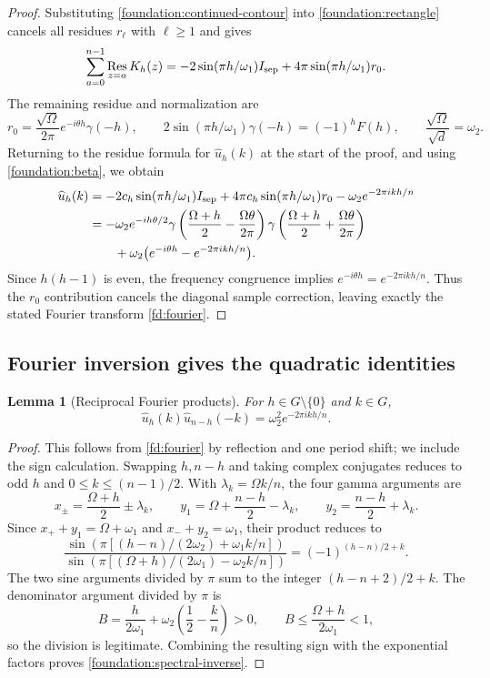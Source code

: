 \documentclass[11pt]{article}
\numberwithin{equation}{section}
\newtheorem{lemma}[theorem]{Lemma}
\theoremstyle{definition}
\theoremstyle{remark}
\DeclareMathOperator{\Res}{Res}
\begin{document}
\begin{proof}
Substituting \eqref{foundation:continued-contour} into
\eqref{foundation:rectangle} cancels all residues $r_\ell$ with
$\ell\geq1$ and gives
\[
 \sum_{a=0}^{n-1}\Res_{z=a}K_h(z)
 =-2\sin(\pi h/\omega_1)I_{\rm sep}
       +4\pi\sin(\pi h/\omega_1)r_0.
\]
The remaining residue and normalization are
\[
 r_0=\frac{\sqrt\Omega}{2\pi}e^{-i\theta h}\gamma(-h),\qquad
 2\sin(\pi h/\omega_1)\gamma(-h)=(-1)^hF(h),\qquad
 \frac{\sqrt\Omega}{\sqrt d}=\omega_2.
\]
Returning to the residue formula for $\widehat u_h(k)$ at the start
of the proof, and using \eqref{foundation:beta}, we obtain
\begin{align*}
 \widehat u_h(k)
 &=-2c_h\sin(\pi h/\omega_1)I_{\rm sep}
     +4\pi c_h\sin(\pi h/\omega_1)r_0-\omega_2e^{-2\pi ikh/n}\\
 &=-\omega_2e^{-ih\theta/2}
   \gamma\left(\frac{\Omega+h}{2}-\frac{\Omega\theta}{2\pi}\right)
   \gamma\left(\frac{\Omega+h}{2}+\frac{\Omega\theta}{2\pi}\right)\\
 &\qquad+\omega_2\bigl(e^{-i\theta h}-e^{-2\pi ikh/n}\bigr).
\end{align*}
Since $h(h-1)$ is even, the frequency congruence implies
$e^{-i\theta h}=e^{-2\pi ikh/n}$. Thus the $r_0$ contribution cancels
the diagonal sample correction, leaving exactly the stated Fourier
transform \eqref{fd:fourier}.
\end{proof}

\subsection{Fourier inversion gives the quadratic identities}

\begin{lemma}[Reciprocal Fourier products]\label{foundation:fourier-products}
For $h\in G\setminus\{0\}$ and $k\in G$,
\begin{equation}\label{foundation:spectral-inverse}
 \widehat u_h(k)\widehat u_{n-h}(-k)
 =\omega_2^2e^{-2\pi ikh/n}.
\end{equation}
\end{lemma}

\begin{proof}
This follows from \eqref{fd:fourier} by reflection and one period
shift; we include the sign calculation. Swapping $h,n-h$ and taking
complex conjugates reduces to odd $h$ and
$0\leq k\leq(n-1)/2$. With $\lambda_k=\Omega k/n$, the four gamma
arguments are
\[
 x_\pm=\frac{\Omega+h}{2}\pm\lambda_k,\qquad
 y_1=\Omega+\frac{n-h}{2}-\lambda_k,\qquad
 y_2=\frac{n-h}{2}+\lambda_k.
\]
Since $x_++y_1=\Omega+\omega_1$ and $x_-+y_2=\omega_1$,
their product reduces to
\[
 \frac{\sin\!\left(\pi[(h-n)/(2\omega_2)+\omega_1k/n]\right)}
      {\sin\!\left(\pi[(\Omega+h)/(2\omega_1)-\omega_2k/n]\right)}
 =(-1)^{(h-n)/2+k}.
\]
The two sine arguments divided by $\pi$ sum to the integer
$(h-n+2)/2+k$. The denominator argument divided by $\pi$ is
\[
 B=\frac{h}{2\omega_1}+\omega_2\left(\frac12-\frac{k}{n}\right)>0,
 \qquad B\leq\frac{\Omega+h}{2\omega_1}<1,
\]
so the division is legitimate. Combining the resulting sign with the
exponential factors
proves \eqref{foundation:spectral-inverse}.
\end{proof}
\end{document}
